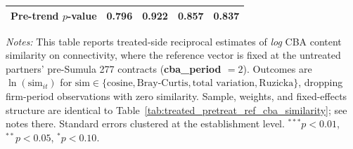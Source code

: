 \begin{table}[H]
\begin{tabular}{lcccc}
Pre-trend $p$-value & 0.796 & 0.922 & 0.857 & 0.837 \\
\bottomrule
\end{tabular}
\begin{minipage}{\linewidth}
\footnotesize\vspace{4pt}
\textit{Notes:} This table reports treated-side reciprocal estimates of \emph{log} CBA content similarity on connectivity, where the reference vector is fixed at the untreated partners' pre-Sumula 277 contracts (\textbf{cba\_period $= 2$}). Outcomes are $\ln(\text{sim}_{it})$ for $\text{sim} \in \{\text{cosine}, \text{Bray-Curtis}, \text{total variation}, \text{Ruzicka}\}$, dropping firm-period observations with zero similarity. Sample, weights, and fixed-effects structure are identical to Table~\ref{tab:treated_pretreat_ref_cba_similarity}; see notes there. Standard errors clustered at the establishment level. $^{***}p<0.01$, $^{**}p<0.05$, $^{*}p<0.10$.
\end{minipage}
\end{table}
